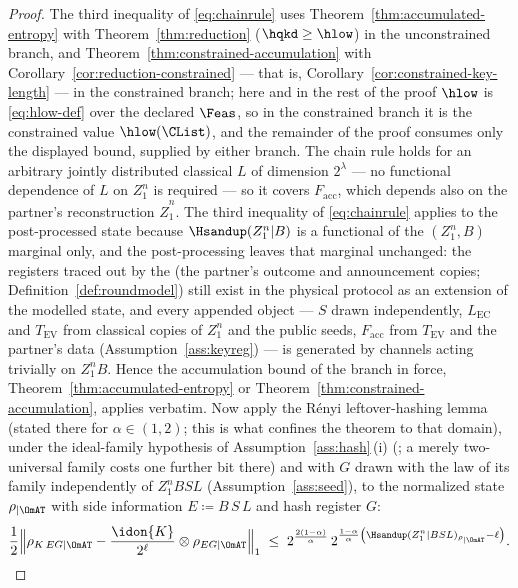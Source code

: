 \begin{proof}
The third inequality of \eqref{eq:chainrule} uses
Theorem~\ref{thm:accumulated-entropy} with
Theorem~\ref{thm:reduction} ($\hqkd\ge\hlow$) in the unconstrained
branch, and Theorem~\ref{thm:constrained-accumulation} with
Corollary~\ref{cor:reduction-constrained} --- that is,
Corollary~\ref{cor:constrained-key-length} --- in the constrained branch;
here and in the rest of the proof $\hlow$ is \eqref{eq:hlow-def} over the
declared $\Feas$, so in the constrained branch it is the constrained value
$\hlow(\CList)$, and the remainder of the proof consumes only the
displayed bound, supplied by either branch. The chain rule holds for an
arbitrary jointly distributed classical $L$ of dimension $2^{\lambda}$ ---
no functional dependence of $L$ on $Z_1^n$ is required --- so it covers
$F_{\mathrm{acc}}$, which depends also on the partner's reconstruction
$\hat Z_1^n$. The third inequality of \eqref{eq:chainrule} applies to the
post-processed state because
$\Hsandup(Z_1^n|B)$ is a functional of the $(Z_1^n,B)$ marginal only, and
the post-processing leaves that marginal unchanged: the registers traced out
by the  (the partner's outcome and
announcement copies;
Definition~\ref{def:roundmodel}) still exist in the physical protocol as an
extension of the modelled state, and every appended object ---
$S$ drawn independently, $L_{\mathrm{EC}}$ and $T_{\mathrm{EV}}$ from
classical copies of $Z_1^n$ and the public seeds, $F_{\mathrm{acc}}$ from
$T_{\mathrm{EV}}$ and the partner's data (Assumption~\ref{ass:keyreg}) --- is
generated by channels acting trivially on $Z_1^nB$. Hence the accumulation
bound of the branch in force, Theorem~\ref{thm:accumulated-entropy} or
Theorem~\ref{thm:constrained-accumulation}, applies verbatim. Now apply the
R\'enyi leftover-hashing lemma \cite[Thm.~4, Eq.~(13)]{kamin2025renyi}
(stated there for $\alpha\in(1,2)$; this is what confines the theorem to
that domain), under the ideal-family hypothesis of
Assumption~\ref{ass:hash}\,(i) (\cite[Lemma~6.5, Rem.~6.1]{tupkary2026decoy};
a merely two-universal family costs one further bit there) and with $G$
drawn with the law of its family independently of $Z_1^nBSL$
(Assumption~\ref{ass:seed}), to the normalized state $\rho_{|\OmAT}$ with
side information $E\coloneqq B\,S\,L$ and hash register $G$:
\begin{equation*}
  \frac12\Big\|\rho_{K\,EG|\OmAT}-\frac{\idon{K}}{2^{\ell}}\otimes
  \rho_{EG|\OmAT}\Big\|_1
  \;\le\;2^{\frac{2(1-\alpha)}{\alpha}}\,
  2^{\frac{1-\alpha}{\alpha}\left(
  \Hsandup(Z_1^n|BSL)_{\rho_{|\OmAT}}-\ell\right)} .

\end{equation*}
\end{proof}

